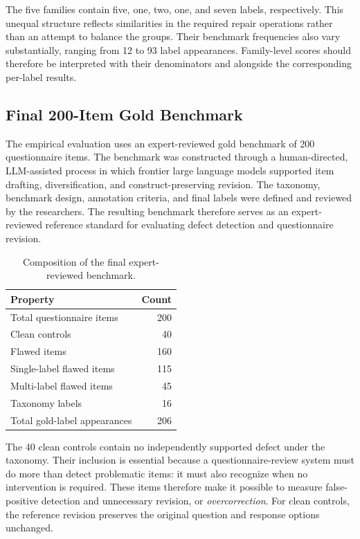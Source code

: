 \documentclass[11pt,a4paper]{article}
\begin{document}
The five families contain five, one, two, one, and seven labels, respectively.
This unequal structure reflects similarities in the required repair operations
rather than an attempt to balance the groups. Their benchmark frequencies also
vary substantially, ranging from 12 to 93 label appearances. Family-level scores
should therefore be interpreted with their denominators and alongside the
corresponding per-label results.

\subsection{Final 200-Item Gold Benchmark}
\label{subsec:gold-benchmark}

The empirical evaluation uses an expert-reviewed gold benchmark of 200 questionnaire items. The benchmark was constructed through a human-directed, LLM-assisted process in which frontier large language models supported item drafting, diversification, and construct-preserving revision. The taxonomy, benchmark design, annotation criteria, and final labels were defined and reviewed by the researchers. The resulting benchmark therefore serves as an expert-reviewed reference standard for evaluating defect detection and questionnaire revision.

\begin{table}[H]
\centering
\caption{Composition of the final expert-reviewed benchmark.}
\label{tab:benchmark-composition}
\small
\begin{tabular}{lr}
\toprule
\textbf{Property} & \textbf{Count}\\
\midrule
Total questionnaire items & 200\\
Clean controls & 40\\
Flawed items & 160\\
Single-label flawed items & 115\\
Multi-label flawed items & 45\\
Taxonomy labels & 16\\
Total gold-label appearances & 206\\
\bottomrule
\end{tabular}
\end{table}

The 40 clean controls contain no independently supported defect under the
taxonomy. Their inclusion is essential because a questionnaire-review system
must do more than detect problematic items: it must also recognize when no
intervention is required. These items therefore make it possible to measure
false-positive detection and unnecessary revision, or \emph{overcorrection}.
For clean controls, the reference revision preserves the original question and
response options unchanged.
\end{document}
